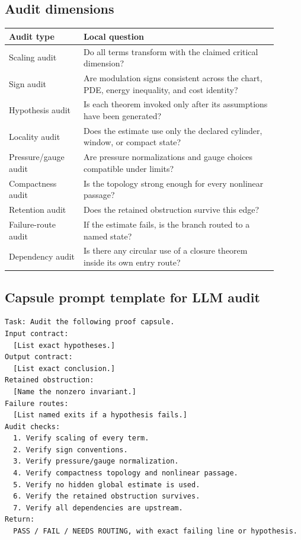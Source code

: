 \documentclass[11pt]{article}
\theoremstyle{plain}
\theoremstyle{definition}
\theoremstyle{remark}
\begin{document}
\subsection{Audit dimensions}
\begin{center}
\begin{longtable}{p{0.25\linewidth}p{0.65\linewidth}}
\toprule
Audit type & Local question \\
\midrule
Scaling audit & Do all terms transform with the claimed critical dimension? \\
Sign audit & Are modulation signs consistent across the chart, PDE, energy inequality, and cost identity? \\
Hypothesis audit & Is each theorem invoked only after its assumptions have been generated? \\
Locality audit & Does the estimate use only the declared cylinder, window, or compact state? \\
Pressure/gauge audit & Are pressure normalizations and gauge choices compatible under limits? \\
Compactness audit & Is the topology strong enough for every nonlinear passage? \\
Retention audit & Does the retained obstruction survive this edge? \\
Failure-route audit & If the estimate fails, is the branch routed to a named state? \\
Dependency audit & Is there any circular use of a closure theorem inside its own entry route? \\
\bottomrule
\end{longtable}
\end{center}

\subsection{Capsule prompt template for LLM audit}
\begin{lstlisting}
Task: Audit the following proof capsule.
Input contract:
  [List exact hypotheses.]
Output contract:
  [List exact conclusion.]
Retained obstruction:
  [Name the nonzero invariant.]
Failure routes:
  [List named exits if a hypothesis fails.]
Audit checks:
  1. Verify scaling of every term.
  2. Verify sign conventions.
  3. Verify pressure/gauge normalization.
  4. Verify compactness topology and nonlinear passage.
  5. Verify no hidden global estimate is used.
  6. Verify the retained obstruction survives.
  7. Verify all dependencies are upstream.
Return:
  PASS / FAIL / NEEDS ROUTING, with exact failing line or hypothesis.
\end{lstlisting}
\end{document}

